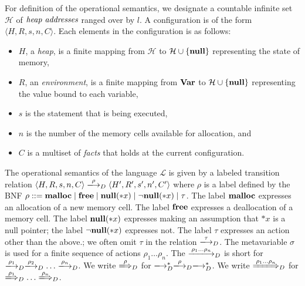 For definition of the operational semantics, we designate a countable
infinite set \(\mathcal{H}\) of \(\emph{heap addresses}\) ranged over by
\(l\).  A configuration is of the form \(\langle H, R, s, n, C
\rangle\).  Each elements in the configuration is as follows:
\begin{itemize}
\item \(H\), a \emph{heap}, is a finite mapping from \(\mathcal{H}\) to
  \(\mathcal{H} \cup \{\mathbf{null}\}\) representing the state of memory,
\item \(R\), an \emph{environment}, is a finite mapping from \(\mathbf{Var}\)
  to \(\mathcal{H} \cup \{\mathbf{null}\}\) representing the value bound to
      each variable,
\item \(s\) is the statement that is being executed,
\item \(n\) is the number of the memory cells available for allocation,
      and
\item \(C\) is a multiset of \emph{facts} that holds at the current
      configuration.
\end{itemize}

The operational semantics of the language \(\mathcal{L}\) is given by a
labeled transition relation \(\langle H, R, s, n, C \rangle
\xlongrightarrow{\rho}_D \langle H', R', s', n', C' \rangle\) where
\(\rho\) is a label defined by the BNF $\rho ::= \mathbf{malloc} \mid \mathbf{free} \mid
\mathbf{null}(*x) \mid \neg\mathbf{null}(*x) \mid \tau$.  The label \(\mathbf{malloc}\) expresses an
allocation of a new memory cell.  The label \(\mathbf{free}\) expresses a
deallocation of a memory cell.  The label \(\mathbf{null}(*x)\) expresses making an
assumption that \(*x\) is a null pointer; the label $\neg\mathbf{null}(*x)$ expresses
not.  The label \(\tau\) expresses an action other than the above.; we
often omit \(\tau\) in the relation \(\xlongrightarrow{\tau}_D\).  The
metavariable \(\sigma\) is used for a finite sequence of actions
\(\rho_1\dots\rho_n\). The \(\xlongrightarrow{\rho_1\dots\rho_n}_D\) is
short for
\(\xlongrightarrow{\rho_1}_D\xlongrightarrow{\rho_2}_D\dots\xlongrightarrow{\rho_n}_D\).
We write \(\xLongrightarrow{\rho}_D\) for
\(\xlongrightarrow{}_D^*\xlongrightarrow{\rho}_D\xlongrightarrow{}_D^*\).
We write \(\xLongrightarrow{\rho_1\dots\rho_n}_D\) for
\(\xLongrightarrow{\rho_1}_D\dots\xLongrightarrow{\rho_n}_D\).

